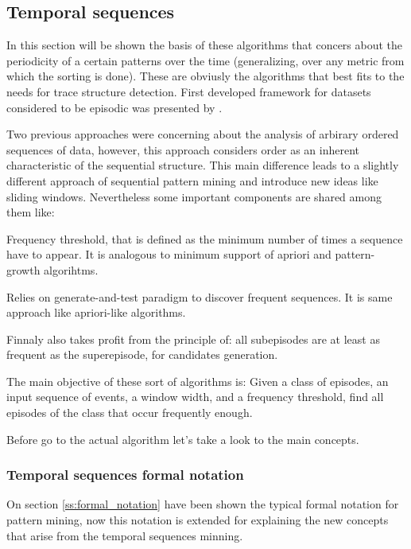 \subsection{Temporal sequences}\label{ss:temporal_sequences}

In this section will be shown the basis of these algorithms that concers about
the periodicity of a certain patterns over the time (generalizing, over any
metric from which the sorting is done). These are obviusly the
algorithms that best fits to the needs for trace structure detection. First
developed framework for datasets considered to be episodic was presented by
\cite{mannila1995discovering}.

Two previous approaches were concerning about the analysis of arbirary ordered
sequences of data, however, this approach considers order as an inherent
characteristic of the sequential structure. This main difference leads to a
slightly different approach of sequential pattern mining and introduce new ideas 
like sliding windows. Nevertheless some important components are shared among 
them like:
\begin{enumerate*}[label=(\roman*)]
  \item Frequency threshold, that is defined as the minimum number of times a
    sequence have to appear. It is analogous to minimum support of apriori and
    pattern-growth algorihtms.
  \item Relies on generate-and-test paradigm to discover frequent sequences. It
    is same approach like apriori-like algorithms.
  \item Finnaly also takes profit from the principle of: all subepisodes are at
    least as frequent as the superepisode, for candidates generation.
\end{enumerate*}

The main objective of these sort of algorithms is: Given a class of episodes, an
input sequence of events, a window width, and a frequency threshold, find all
episodes of the class that occur frequently enough. 

Before go to the actual algorithm let's take a look to the main concepts.

\subsubsection{Temporal sequences formal notation}

On section \ref{ss:formal_notation} have been shown the typical formal notation
for pattern mining, now this notation is extended for explaining the new
concepts that arise from the temporal sequences minning.

